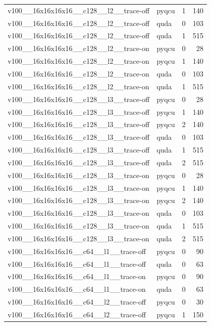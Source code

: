 \begin{table}[htbp]
\begin{tabular}{@{}llrr@{}}
v100\_\_16x16x16x16\_\_c128\_\_l2\_\_trace-off & pyqcu & 1 & 140 \\
v100\_\_16x16x16x16\_\_c128\_\_l2\_\_trace-off & quda & 0 & 103 \\
v100\_\_16x16x16x16\_\_c128\_\_l2\_\_trace-off & quda & 1 & 515 \\
v100\_\_16x16x16x16\_\_c128\_\_l2\_\_trace-on & pyqcu & 0 & 28 \\
v100\_\_16x16x16x16\_\_c128\_\_l2\_\_trace-on & pyqcu & 1 & 140 \\
v100\_\_16x16x16x16\_\_c128\_\_l2\_\_trace-on & quda & 0 & 103 \\
v100\_\_16x16x16x16\_\_c128\_\_l2\_\_trace-on & quda & 1 & 515 \\
v100\_\_16x16x16x16\_\_c128\_\_l3\_\_trace-off & pyqcu & 0 & 28 \\
v100\_\_16x16x16x16\_\_c128\_\_l3\_\_trace-off & pyqcu & 1 & 140 \\
v100\_\_16x16x16x16\_\_c128\_\_l3\_\_trace-off & pyqcu & 2 & 140 \\
v100\_\_16x16x16x16\_\_c128\_\_l3\_\_trace-off & quda & 0 & 103 \\
v100\_\_16x16x16x16\_\_c128\_\_l3\_\_trace-off & quda & 1 & 515 \\
v100\_\_16x16x16x16\_\_c128\_\_l3\_\_trace-off & quda & 2 & 515 \\
v100\_\_16x16x16x16\_\_c128\_\_l3\_\_trace-on & pyqcu & 0 & 28 \\
v100\_\_16x16x16x16\_\_c128\_\_l3\_\_trace-on & pyqcu & 1 & 140 \\
v100\_\_16x16x16x16\_\_c128\_\_l3\_\_trace-on & pyqcu & 2 & 140 \\
v100\_\_16x16x16x16\_\_c128\_\_l3\_\_trace-on & quda & 0 & 103 \\
v100\_\_16x16x16x16\_\_c128\_\_l3\_\_trace-on & quda & 1 & 515 \\
v100\_\_16x16x16x16\_\_c128\_\_l3\_\_trace-on & quda & 2 & 515 \\
v100\_\_16x16x16x16\_\_c64\_\_l1\_\_trace-off & pyqcu & 0 & 90 \\
v100\_\_16x16x16x16\_\_c64\_\_l1\_\_trace-off & quda & 0 & 63 \\
v100\_\_16x16x16x16\_\_c64\_\_l1\_\_trace-on & pyqcu & 0 & 90 \\
v100\_\_16x16x16x16\_\_c64\_\_l1\_\_trace-on & quda & 0 & 63 \\
v100\_\_16x16x16x16\_\_c64\_\_l2\_\_trace-off & pyqcu & 0 & 30 \\
v100\_\_16x16x16x16\_\_c64\_\_l2\_\_trace-off & pyqcu & 1 & 150 \\

\end{tabular}
\end{table}
